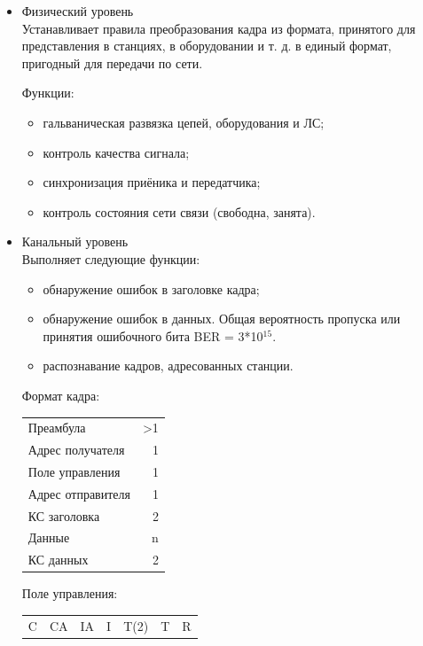 \documentclass[12pt, russian, oneside, article]{ncc}
\begin{document}
\begin{itemize}

\item Физический уровень\\
\label{sec-5_2_3_1}%
Устанавливает правила преобразования кадра из формата, принятого для представления в станциях, в оборудовании и т. д. в единый формат, пригодный для передачи по сети.

Функции:
\begin{itemize}
\item гальваническая развязка цепей, оборудования и ЛС;
\item контроль качества сигнала;
\item синхронизация приёника и передатчика;
\item контроль состояния сети связи (свободна, занята).
\end{itemize}


\item Канальный уровень\\
\label{sec-5_2_3_2}%
Выполняет следующие функции:
\begin{itemize}
\item обнаружение ошибок в заголовке кадра;
\item обнаружение ошибок в данных. Общая вероятность пропуска или принятия ошибочного бита BER = 3*10$^{\mathrm{15}}$.
\item распознавание кадров, адресованных станции.
\end{itemize}

Формат кадра:

\begin{center}
\begin{tabular}{lr}
 Преамбула          &  >1  \\
 Адрес получателя   &   1  \\
 Поле управления    &   1  \\
 Адрес отправителя  &   1  \\
 КС заголовка       &   2  \\
 Данные             &   n  \\
 КС данных          &   2  \\
\end{tabular}
\end{center}



Поле управления:

\begin{center}
\begin{tabular}{lllllll}
 C  &  CA  &  IA  &  I  &  T(2)  &  T  &  R  \\
\end{tabular}
\end{center}




\end{itemize}
\end{document}
